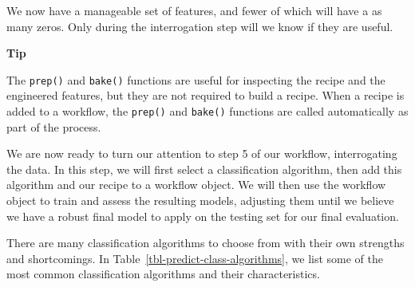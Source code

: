 \documentclass[
  letterpaper,
  krantz1]{latex/krantz-mod}
\theoremstyle{definition}
\theoremstyle{definition}
\theoremstyle{remark}
\begin{document}
We now have a manageable set of features, and fewer of which will have a
as many zeros. Only during the interrogation step will we know if they
are useful.

\begin{tcolorbox}[enhanced jigsaw, toprule=.15mm, breakable, colback=white, arc=.35mm, left=2mm, colframe=quarto-callout-color-frame, opacityback=0, bottomrule=.15mm, rightrule=.15mm, leftrule=.75mm]

\textbf{ Tip}

The \texttt{prep()} and \texttt{bake()} functions are useful for
inspecting the recipe and the engineered features, but they are not
required to build a recipe. When a recipe is added to a workflow, the
\texttt{prep()} and \texttt{bake()} functions are called automatically
as part of the process.

\end{tcolorbox}

We are now ready to turn our attention to step 5 of our workflow,
interrogating the data. In this step, we will first select a
classification algorithm, then add this
algorithm and our recipe to a workflow object. We will then use the
workflow object to train and assess the resulting models, adjusting them
until we believe we have a robust final model to apply on the testing
set for our final evaluation.

There are many classification algorithms to choose from with their own
strengths and shortcomings. In Table~\ref{tbl-predict-class-algorithms},
we list some of the most common classification algorithms and their
characteristics.
\end{document}
